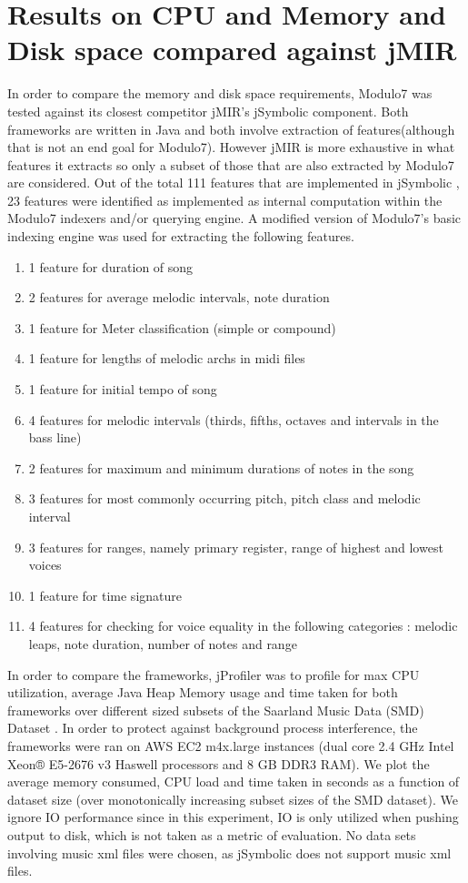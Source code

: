 \section{Results on CPU and Memory and Disk space compared against jMIR}

\noindent In order to compare the memory and disk space requirements, Modulo7 was tested against its closest competitor jMIR's \cite{jMIR} jSymbolic component. Both frameworks are written in Java and both involve extraction of features(although that is not an end goal for Modulo7). However jMIR is more exhaustive in what features it extracts so only a subset of those that are also extracted by Modulo7 are considered. Out of the total 111 features that are implemented in jSymbolic \cite{jSymbolic}, 23 features were identified as implemented as internal computation within the Modulo7 indexers and/or querying engine. A modified version of Modulo7's basic indexing engine was used for extracting the following features. 
\begin{enumerate}
\item 1 feature for duration of song
\item 2 features for average melodic intervals, note duration
\item 1 feature for Meter classification (simple or compound)
\item 1 feature for lengths of melodic archs in midi files
\item 1 feature for initial tempo of song
\item 4 features for melodic intervals (thirds, fifths, octaves and intervals in the bass line)
\item 2 features for maximum and minimum durations of notes in the song
\item 3 features for most commonly occurring pitch, pitch class and melodic interval
\item 3 features for ranges, namely primary register, range of highest and lowest voices
\item 1 feature for time signature
\item 4 features for checking for voice equality in the following categories : melodic leaps, note duration, number of notes and range \\
\end{enumerate}
\noindent In order to compare the frameworks, jProfiler was to profile for max CPU utilization, average Java Heap Memory usage and time taken for both frameworks over different sized subsets of the Saarland Music Data (SMD) Dataset \cite{saarlandmsd}. In order to protect against background process interference, the frameworks were ran on AWS EC2 m4x.large instances (dual core 2.4 GHz Intel Xeon® E5-2676 v3 Haswell processors and 8 GB DDR3 RAM). We plot the average memory consumed, CPU load and time taken in seconds as a function of dataset size (over monotonically increasing subset sizes of the SMD dataset). We ignore IO performance since in this experiment, IO is only utilized when pushing output to disk, which is not taken as a metric of evaluation. No data sets involving music xml files were chosen, as jSymbolic does not support music xml files.\\ 

